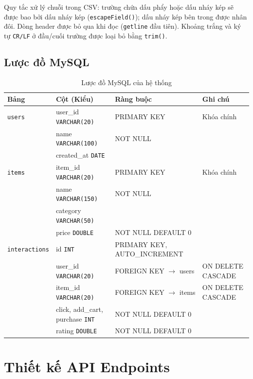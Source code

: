 \documentclass{report}
\begin{document}
Quy tắc xử lý chuỗi trong CSV: trường chứa dấu phẩy hoặc dấu nháy kép sẽ được bao bởi dấu nháy kép (\texttt{escapeField()}); dấu nháy kép bên trong được nhân đôi. Dòng header được bỏ qua khi đọc (\texttt{getline} đầu tiên). Khoảng trắng và ký tự \texttt{CR/LF} ở đầu/cuối trường được loại bỏ bằng \texttt{trim()}.

\subsection{Lược đồ MySQL}

\begin{table}[H]
    \centering
    \renewcommand{\arraystretch}{1.4}
    \begin{tabularx}{\textwidth}{|l|>{\raggedright\arraybackslash}X|>{\raggedright\arraybackslash}X|l|}
        \hline
        \textbf{Bảng} & \textbf{Cột (Kiểu)} & \textbf{Ràng buộc} & \textbf{Ghi chú} \\ \hline
        \texttt{users} & user\_id \texttt{VARCHAR(20)} & PRIMARY KEY & Khóa chính \\ \hline
        & name \texttt{VARCHAR(100)} & NOT NULL & \\ \hline
        & created\_at \texttt{DATE} & & \\ \hline
        \texttt{items} & item\_id \texttt{VARCHAR(20)} & PRIMARY KEY & Khóa chính \\ \hline
        & name \texttt{VARCHAR(150)} & NOT NULL & \\ \hline
        & category \texttt{VARCHAR(50)} & & \\ \hline
        & price \texttt{DOUBLE} & NOT NULL DEFAULT 0 & \\ \hline
        \texttt{interactions} & id \texttt{INT} & PRIMARY KEY, AUTO\_INCREMENT & \\ \hline
        & user\_id \texttt{VARCHAR(20)} & FOREIGN KEY $\to$ users & ON DELETE CASCADE \\ \hline
        & item\_id \texttt{VARCHAR(20)} & FOREIGN KEY $\to$ items & ON DELETE CASCADE \\ \hline
        & click, add\_cart, purchase \texttt{INT} & NOT NULL DEFAULT 0 & \\ \hline
        & rating \texttt{DOUBLE} & NOT NULL DEFAULT 0 & \\ \hline
    \end{tabularx}
    \caption{Lược đồ MySQL của hệ thống}
    \label{tab:mysql_schema}
\end{table}

\section{Thiết kế API Endpoints}
\end{document}
